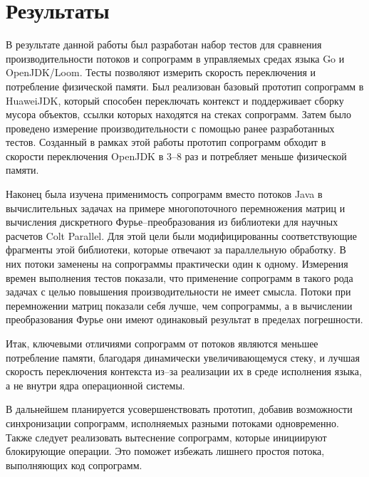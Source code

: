 \section{Результаты}
	В результате данной работы был разработан набор тестов для сравнения производительности потоков и сопрограмм в
	управляемых средах языка Go и OpenJDK/Loom. Тесты позволяют измерить скорость переключения и
	потребление физической памяти. Был реализован базовый прототип сопрограмм в
	HuaweiJDK, который способен переключать контекст и поддерживает сборку мусора объектов, ссылки которых находятся
	на стеках сопрограмм. Затем было проведено измерение производительности с помощью ранее разработанных тестов.
	Созданный в рамках этой работы прототип сопрограмм обходит в скорости переключения
	OpenJDK в 3--8 раз и потребляет меньше физической памяти.
	\par
	Наконец была изучена применимость сопрограмм вместо потоков Java в вычислительных задачах на
	примере многопоточного перемножения матриц и вычисления дискретного Фурье--преобразования 
	из библиотеки для научных расчетов Colt Parallel. Для этой цели были модифицированны соответствующие 
	фрагменты этой библиотеки, которые отвечают за параллельную обработку. В них потоки заменены 
	на сопрограммы практически один к одному.
	Измерения времен выполнения тестов показали, что применение сопрограмм в такого рода задачах с целью
	повышения производительности не имеет смысла. Потоки при перемножении матриц показали себя лучше,
	чем сопрограммы, а в вычислении преобразования Фурье они имеют одинаковый результат в пределах погрешности.
	
	\par
	Итак, ключевыми отличиями сопрограмм от потоков являются меньшее потребление памяти, благодаря
	динамически увеличивающемуся стеку, и лучшая скорость 
	переключения контекста из--за реализации их в среде исполнения языка, а не внутри ядра операционной системы.
	\par
	В дальнейшем планируется усовершенствовать прототип, добавив возможности синхронизации
	сопрограмм, исполняемых разными потоками одновременно. Также следует реализовать вытеснение сопрограмм, которые
	инициируют блокирующие операции. Это поможет избежать лишнего простоя потока, выполняющих код сопрограмм.
	
\clearpage
